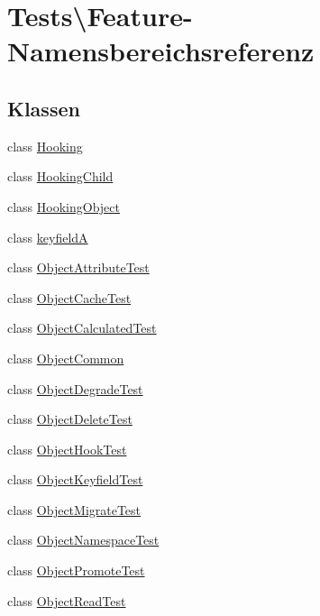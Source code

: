 \hypertarget{namespaceTests_1_1Feature}{}\section{Tests\textbackslash{}Feature-\/\+Namensbereichsreferenz}
\label{namespaceTests_1_1Feature}
\subsection*{Klassen}
\begin{DoxyCompactItemize}
\item 
class \hyperlink{classTests_1_1Feature_1_1Hooking}{Hooking}
\item 
class \hyperlink{classTests_1_1Feature_1_1HookingChild}{Hooking\+Child}
\item 
class \hyperlink{classTests_1_1Feature_1_1HookingObject}{Hooking\+Object}
\item 
class \hyperlink{classTests_1_1Feature_1_1keyfieldA}{keyfieldA}
\item 
class \hyperlink{classTests_1_1Feature_1_1ObjectAttributeTest}{Object\+Attribute\+Test}
\item 
class \hyperlink{classTests_1_1Feature_1_1ObjectCacheTest}{Object\+Cache\+Test}
\item 
class \hyperlink{classTests_1_1Feature_1_1ObjectCalculatedTest}{Object\+Calculated\+Test}
\item 
class \hyperlink{classTests_1_1Feature_1_1ObjectCommon}{Object\+Common}
\item 
class \hyperlink{classTests_1_1Feature_1_1ObjectDegradeTest}{Object\+Degrade\+Test}
\item 
class \hyperlink{classTests_1_1Feature_1_1ObjectDeleteTest}{Object\+Delete\+Test}
\item 
class \hyperlink{classTests_1_1Feature_1_1ObjectHookTest}{Object\+Hook\+Test}
\item 
class \hyperlink{classTests_1_1Feature_1_1ObjectKeyfieldTest}{Object\+Keyfield\+Test}
\item 
class \hyperlink{classTests_1_1Feature_1_1ObjectMigrateTest}{Object\+Migrate\+Test}
\item 
class \hyperlink{classTests_1_1Feature_1_1ObjectNamespaceTest}{Object\+Namespace\+Test}
\item 
class \hyperlink{classTests_1_1Feature_1_1ObjectPromoteTest}{Object\+Promote\+Test}
\item 
class \hyperlink{classTests_1_1Feature_1_1ObjectReadTest}{Object\+Read\+Test}

\end{DoxyCompactItemize}
